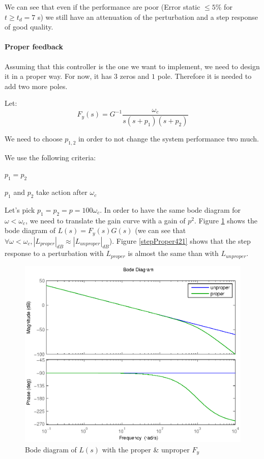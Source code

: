 We can see that even if the performance are poor (Error static $\leq 5\%$ for $t \geq t_d = 7$ s) we still have an attenuation of the perturbation and a step response of good quality.

\paragraph{Proper feedback}
Assuming that this controller is the one we want to implement, we need to design it in a proper way.
For now, it has $3$ zeros and $1$ pole.
Therefore it is needed to add two more poles.

Let:
$$F_y(s) = G^{-1}\frac{\omega_c}{s(s+p_1)(s+p_2)}$$

We need to choose $p_{1,2}$ in order to not change the system performance two much.

We use the following criteria:

\begin{shortitemize}
    \item $p_1 = p_2$
    \item $p_1$ and $p_2$ take action after $\omega_c$ 
\end{shortitemize}

Let's pick $p_1 = p_2 = p = 100\omega_c$.
In order to have the same bode diagram for $\omega < \omega_c$, we need to translate the gain curve with a gain of $p^2$.
Figure \ref{bodeProper421} shows the bode diagram of $L(s) = F_y(s) G(s)$ (we can see that $\forall \omega < \omega_c, |L_{proper}|_{dB} \approx |L_{unproper}|_{dB}$).
Figure \ref{stepProper421} shows that the step response to a perturbation with $L_{proper}$ is almost the same than with $L_{unproper}$.

\begin{figure}[h!b]
    \includegraphics[width=\columnwidth]{fig/bodeProper421.eps}
    \caption{Bode diagram of $L(s)$ with the proper \& unproper $F_y$} 
    \label{bodeProper421}
\end{figure}


